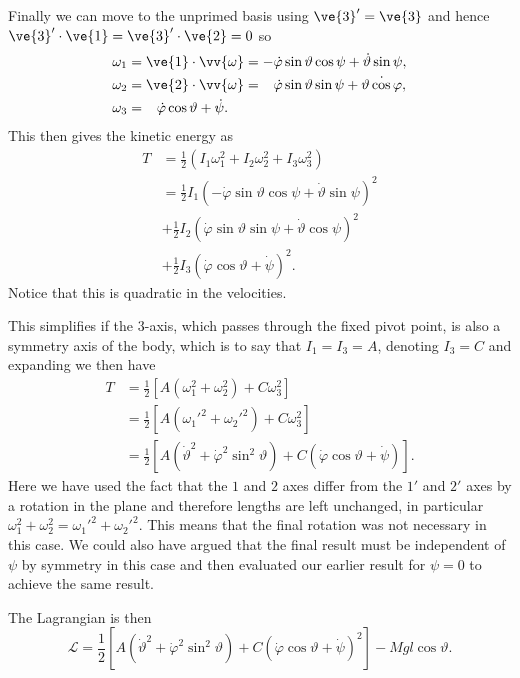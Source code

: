 \documentclass[fleqn]{NotesClass}
\newcommand*{\lagrangian}{\mathcal{L}}
\begin{document}
    Finally we can move to the unprimed basis using \(\ve{3}' = \ve{3}\) and hence \(\ve{3}' \cdot \ve{1} = \ve{3}' \cdot \ve{2} = 0\) so
    \begin{align}
        \omega_1 &= \ve{1} \cdot \vv{\omega} = -\dot{\varphi} \sin\vartheta \cos\psi + \dot{\vartheta} \sin\psi,\\
        \omega_2 &= \ve{2} \cdot \vv{\omega} = \hphantom{-}\dot{\varphi}\sin\vartheta\sin\psi + \dot{\vartheta\cos\varphi},\\
        \omega_3 &= \hphantom{-}\dot{\varphi}\cos\vartheta + \dot{\psi}.
    \end{align}
    This then gives the kinetic energy as
    \begin{align}
        T &= \frac{1}{2}(I_1\omega_1^2 + I_2\omega_2^2 + I_3\omega_3^2)\\
        &= \frac{1}{2}I_1(-\dot{\varphi}\sin\vartheta\cos\psi + \dot{\vartheta}\sin\psi)^2\\
        &+ \frac{1}{2}I_2(\dot{\varphi}\sin\vartheta\sin\psi + \dot{\vartheta}\cos\psi)^2\\
        &+ \frac{1}{2}I_3(\dot{\varphi}\cos\vartheta + \dot{\psi})^2.
    \end{align}
    Notice that this is quadratic in the velocities.
    
    This simplifies if the \(3\)-axis, which passes through the fixed pivot point, is also a symmetry axis of the body, which is to say that \(I_1 = I_3 = A\), denoting \(I_3 = C\) and expanding we then have
    \begin{align}
        T &= \frac{1}{2}[A(\omega_1^2 + \omega_2^2) + C\omega_3^2]\\
        &= \frac{1}{2}[A(\omega_1'^2 + \omega_2'^2) + C\omega_3^2]\\
        &= \frac{1}{2}[A(\dot{\vartheta}^2 + \dot{\varphi}^2\sin^2\vartheta) + C(\dot{\varphi}\cos\vartheta + \dot{\psi})].
    \end{align}
    Here we have used the fact that the \(1\) and \(2\) axes differ from the \(1'\) and \(2'\) axes by a rotation in the plane and therefore lengths are left unchanged, in particular \(\omega_1^2 + \omega_2^2 = \omega_1'^2 + \omega_2'^2\).
    This means that the final rotation was not necessary in this case.
    We could also have argued that the final result must be independent of \(\psi\) by symmetry in this case and then evaluated our earlier result for \(\psi = 0\) to achieve the same result.
    
    The Lagrangian is then
    \begin{equation}
        \lagrangian = \frac{1}{2}[A(\dot{\vartheta}^2 + \dot{\varphi}^2\sin^2\vartheta) + C(\dot{\varphi}\cos\vartheta + \dot\psi)^2] - Mgl\cos\vartheta.
    \end{equation}
    
\end{document}
